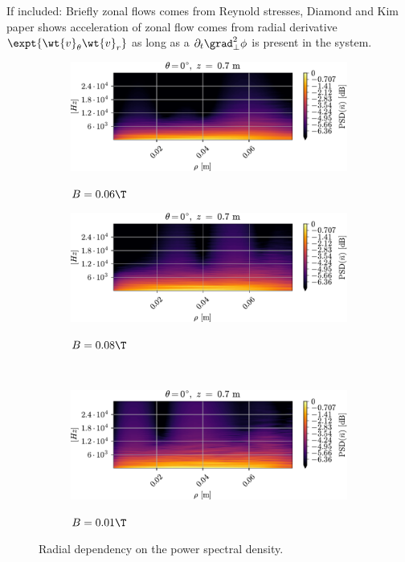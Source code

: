If included: Briefly zonal flows comes from Reynold stresses, Diamond and Kim paper shows acceleration of zonal flow comes from radial derivative $\expt{\wt{v}_\theta\wt{v}_r}$ as long as a $\partial_t \grad_\perp^2 \phi$ is present in the system.
%
\begin{figure}[htbp]
    \centering
    \begin{subfigure}[h]{0.45\textwidth}
        \centering
        \includegraphics[width=1.0\textwidth]{fig/results/poloidalFlow/PSD2D006}
        \label{fig:PSD2D006}
        \caption{$B=0.06\T$}
    \end{subfigure}%
    \hfill
    \begin{subfigure}[h]{0.45\textwidth}
        \centering
        \includegraphics[width=1.0\textwidth]{fig/results/poloidalFlow/PSD2D008}
        \label{fig:PSD2D008}
        \caption{$B=0.08\T$}
    \end{subfigure}
    \\
    \begin{subfigure}[h]{0.45\textwidth}
        \centering
        \includegraphics[width=1.0\textwidth]{fig/results/poloidalFlow/PSD2D01}
        \label{fig:PSD2D008B}
        \caption{$B=0.01\T$}
    \end{subfigure}
    \caption{Radial dependency on the power spectral density.}
    \label{fig:PSD2D}
\end{figure}
